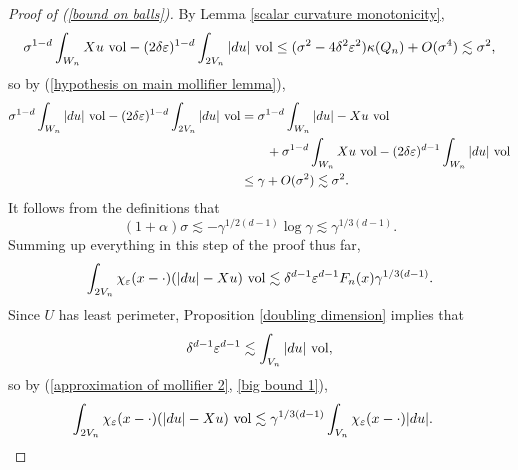 \begin{proof}[Proof of (\ref{bound on balls})]
By Lemma \ref{scalar curvature monotonicity},
$$\sigma^{1 - d} \int_{W_n} X u ~\mathrm{vol} - (2\delta\varepsilon)^{1 - d} \int_{2V_n} |du| ~\mathrm{vol} \leq (\sigma^2 -4\delta^2\varepsilon^2) \kappa(Q_n) + O(\sigma^4) \lesssim \sigma^2,$$
so by (\ref{hypothesis on main mollifier lemma}),
\begin{align*}
\sigma^{1 - d} \int_{W_n} |du| ~\mathrm{vol} - (2\delta\varepsilon)^{1 - d} \int_{2V_n} |du| ~\mathrm{vol} &= \sigma^{1 - d} \int_{W_n} |du| - Xu ~\mathrm{vol} \\
&\qquad + \sigma^{1 - d} \int_{W_n} Xu ~\mathrm{vol} - (2\delta\varepsilon)^{d - 1} \int_{W_n} |du| ~\mathrm{vol} \\
&\leq \gamma + O(\sigma^2) \lesssim \sigma^2.
\end{align*}
It follows from the definitions that
$$(1 + \alpha)\sigma \lesssim -\gamma^{1/2(d - 1)} \log \gamma \lesssim \gamma^{1/3(d - 1)}.$$
Summing up everything in this step of the proof thus far,
\begin{equation}\label{big bound 1}
\int_{2V_n} \chi_\varepsilon(x - \cdot)(|du| - Xu) ~\mathrm{vol} \lesssim \delta^{d - 1} \varepsilon^{d - 1} F_n(x) \gamma^{1/3(d - 1)}.
\end{equation}
Since $U$ has least perimeter, Proposition \ref{doubling dimension} implies that
$$\delta^{d - 1} \varepsilon^{d - 1} \lesssim \int_{V_n} |du| ~\mathrm{vol},$$
so by (\ref{approximation of mollifier 2}, \ref{big bound 1}),
\begin{align*}
\int_{2V_n} \chi_\varepsilon(x - \cdot)(|du| - Xu) ~\mathrm{vol}
&\lesssim \gamma^{1/3(d - 1)} \int_{V_n} \chi_\varepsilon(x - \cdot)|du|.
\qedhere \end{align*}
\end{proof}

